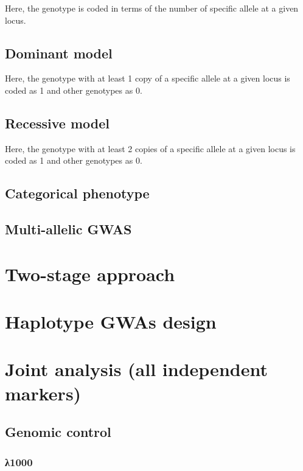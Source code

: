 \documentclass[]{book}
\theoremstyle{definition}
\theoremstyle{definition}
\theoremstyle{definition}
\theoremstyle{remark}
\begin{document}
Here, the genotype is coded in terms of the number of specific allele at
a given locus.

\subsection{Dominant model}\label{dominant-model}

Here, the genotype with at least 1 copy of a specific allele at a given
locus is coded as 1 and other genotypes as 0.

\subsection{Recessive model}\label{recessive-model}

Here, the genotype with at least 2 copies of a specific allele at a
given locus is coded as 1 and other genotypes as 0.

\subsection{Categorical phenotype}\label{categorical-phenotype}

\subsection{Multi-allelic GWAS}\label{multi-allelic-gwas}

\section{Two-stage approach}\label{two-stage-approach}

\section{Haplotype GWAs design}\label{haplotype-gwas-design}

\section{Joint analysis (all independent
markers)}\label{joint-analysis-all-independent-markers}

\subsection{Genomic control}\label{genomic-control}

\subsubsection{λ1000}\label{1000}
\end{document}
